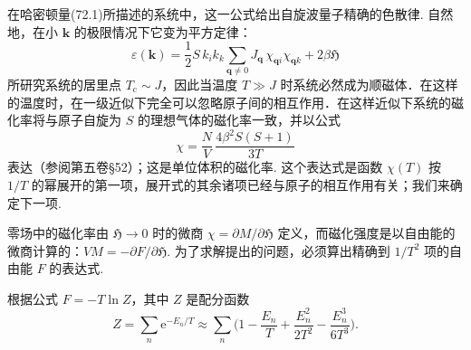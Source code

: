 在哈密顿量(72.1)所描述的系统中，这一公式给出自旋波量子精确的色散律. 自然地，在小 $\bm{k}$ 的极限情况下它变为平方定律：
\begin{equation}
\varepsilon(\bm{k})=\frac{1}{2}S\,k_ik_k\sum_{\bm{q}\neq0}J_{\bm{q}}\,
\chi_{\bm{q}i}\chi_{\bm{q}k}+2\beta\mathfrak{H}
\end{equation}
所研究系统的居里点 $T_{\mathrm{c}}\sim J$，因此当温度 $T\gg J$ 时系统必然成为顺磁体．在这样的温度时，在一级近似下完全可以忽略原子间的相互作用．在这样近似下系统的磁化率将与原子自旋为 $S$ 的理想气体的磁化率一致，并以公式
\begin{equation}
\chi=\frac{N}{V}\,\frac{4\beta^2S(S+1)}{3T}
\end{equation}
表达（参阅第五卷§52）；这是单位体积的磁化率. 这个表达式是函数 $\chi(T)$ 按 $1/T$ 的幂展开的第一项，展开式的其余诸项已经与原子的相互作用有关；我们来确定下一项.

零场中的磁化率由 $\mathfrak{H}\to0$ 时的微商 $\chi=\partial M/\partial\mathfrak{H}$ 定义，而磁化强度是以自由能的微商计算的：$VM=-\partial F/\partial\mathfrak{H}$. 为了求解提出的问题，必须算出精确到 $1/T^2$ 项的自由能 $F$ 的表达式.

根据公式 $F=-T\ln Z$，其中 $Z$ 是配分函数
\begin{equation*}
Z=\sum_n\mathrm{e}^{-E_n/T}\approx\sum_n
\biggl(1-\frac{E_n}{T}+\frac{E_n^2}{2T^2}-\frac{E_n^3}{6T^3}\biggr).
\end{equation*}

